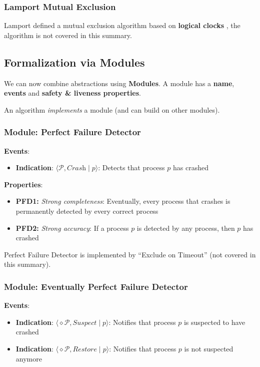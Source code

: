 \documentclass[12pt,A4]{extarticle}
\newcommand{\highlight}[1]{\textcolor{highlightColor}{\textbf{#1}}}
\begin{document}
\subsubsection{Lamport Mutual Exclusion}
Lamport defined a mutual exclusion algorithm based on \textbf{logical clocks} \cite{lamportTimeClocks}, the algorithm is not covered in this summary.

\subsection{Formalization via Modules}
We can now combine abstractions using \highlight{Modules}. A module has a \textbf{name}, \textbf{events} and \textbf{safety \& liveness properties}.\par
An algorithm \textit{implements} a module (and can build on other modules).

\newpage
\subsubsection{Module: Perfect Failure Detector}
\textbf{Events}:
\begin{itemize}
  \item{\textbf{Indication}: $\langle \mathcal{P}, \textit{Crash} \mid p \rangle$: Detects that process $p$ has crashed}
\end{itemize}
\textbf{Properties}:
\begin{itemize}
  \item{\textbf{PFD1:} \textit{Strong completeness}: Eventually, every process that crashes is permanently detected by every correct process}
  \item{\textbf{PFD2:} \textit{Strong accuracy}: If a process $p$ is detected by any process, then $p$ has crashed}
\end{itemize}
Perfect Failure Detector is implemented by ``Exclude on Timeout'' (not covered in this summary).

\subsubsection{Module: Eventually Perfect Failure Detector}
\textbf{Events}:
\begin{itemize}
  \item{\textbf{Indication}: $\langle \diamond \mathcal{P}, \textit{Suspect} \mid p \rangle$: Notifies that process $p$ is suspected to have crashed}
  \item {\textbf{Indication}: $\langle \diamond \mathcal{P}, \textit{Restore} \mid p \rangle$: Notifies that process $p$ is not suspected anymore}
\end{itemize}
\end{document}
